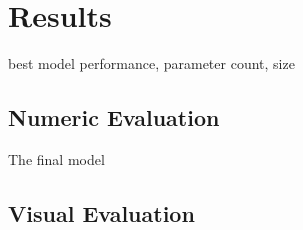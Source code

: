\section{Results}

best model performance, parameter count, size

\subsection{Numeric Evaluation}

The final model 

\subsection{Visual Evaluation}

\subsection{}


\newpage